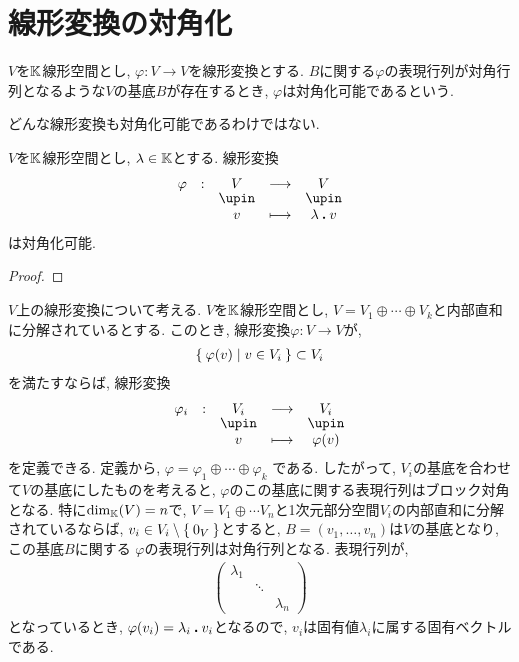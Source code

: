 \section{線形変換の対角化}

\begin{definition}
  $V$を$\mathbb{K}$線形空間とし,
  $\varphi\colon V\to V$を線形変換とする.
  $B$に関する$\varphi$の表現行列が対角行列となるような$V$の基底$B$が存在するとき,
  $\varphi$は対角化可能であるという.
\end{definition}
\begin{remark}
  どんな線形変換も対角化可能であるわけではない.
\end{remark}

\begin{lemma}
  $V$を$\mathbb{K}$線形空間とし,
  $\lambda\in\mathbb{K}$とする.
  線形変換
  \begin{align*}
    \shazo{\varphi}{V}{V}
    {v}{\lambda\act v}
  \end{align*}
  は対角化可能.
\end{lemma}
\begin{proof}\end{proof}

$V$上の線形変換について考える.
$V$を$\mathbb{K}$線形空間とし,
$V=V_1\oplus \cdots \oplus V_k$と内部直和に分解されているとする.
このとき, 線形変換$\varphi\colon V\to V$が,
\begin{align*}
\Set{\varphi(v)|v\in V_i}\subset V_i
\end{align*}
を満たすならば,
線形変換
\begin{align*}
  \shazo{\varphi_i}{V_i}{V_i}
  {v}{\varphi(v)}
\end{align*}
を定義できる.
定義から, $\varphi=\varphi_1\oplus \cdots \oplus \varphi_k$
である.
したがって, $V_i$の基底を合わせて$V$の基底にしたものを考えると,
$\varphi$のこの基底に関する表現行列はブロック対角となる.
特に$\dim_{\mathbb{K}}(V)=n$で, 
$V=V_1\oplus \cdots V_n$と1次元部分空間$V_i$の内部直和に分解されているならば,
$v_i\in V_i\setminus \Set{0_V}$とすると,
$B=(v_1,\ldots,v_n)$は$V$の基底となり,
この基底$B$に関する
$\varphi$の表現行列は対角行列となる.
表現行列が,
\begin{align*}
\begin{pmatrix}\lambda_1&&\\&\ddots&\\&&\lambda_n\end{pmatrix}
\end{align*}
となっているとき, $\varphi(v_i)=\lambda_i\mathbin{\boldsymbol{.}} v_i$となるので,
$v_i$は固有値$\lambda_i$に属する固有ベクトルである.

